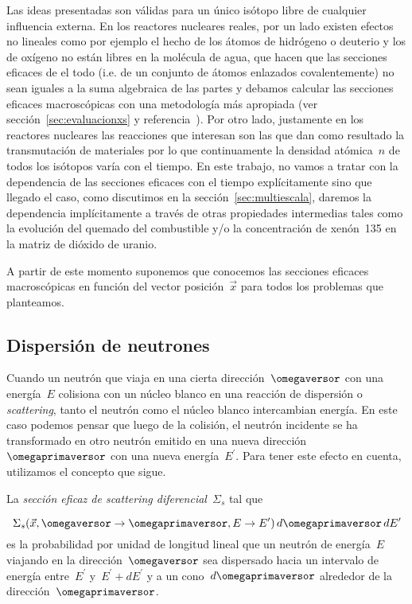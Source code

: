 Las ideas presentadas son válidas para un único isótopo libre de cualquier influencia externa. En los reactores nucleares reales, por un lado existen efectos no lineales como por ejemplo el hecho de los átomos de hidrógeno o deuterio y los de oxígeno no están libres en la molécula de agua, que hacen que las secciones eficaces de el todo (i.e. de un conjunto de átomos enlazados covalentemente) no sean iguales a la suma algebraica de las partes y debamos calcular las secciones eficaces macroscópicas con una metodología más apropiada (ver sección~\ref{sec:evaluacionxs} y referencia~\cite{methods}). Por otro lado, justamente en los reactores nucleares las reacciones que interesan son las que dan como resultado la transmutación de materiales por lo que continuamente la densidad atómica~$n$ de todos los isótopos varía con el tiempo. En este trabajo, no vamos a tratar con la dependencia de las secciones eficaces con el tiempo explícitamente sino que llegado el caso, como discutimos en la sección~\ref{sec:multiescala}, daremos la dependencia implícitamente a través de otras propiedades intermedias tales como la evolución del quemado del combustible y/o la concentración de xenón~135 en la matriz de dióxido de uranio.

\medskip

A partir de este momento suponemos que conocemos las secciones eficaces macroscópicas en función del vector posición~$\vec{x}$ para todos los problemas que planteamos.

\subsection{Dispersión de neutrones} %
\label{sec:scattering}

Cuando un neutrón que viaja en una cierta dirección~$\omegaversor$ con una energía~$E$ colisiona con un núcleo blanco en una reacción de dispersión o \emph{scattering}, tanto el neutrón como el núcleo blanco intercambian energía. En este caso podemos pensar que luego de la colisión, el neutrón incidente se ha transformado en otro neutrón emitido en una nueva dirección~$\omegaprimaversor$ con una nueva energía~$E^\prime$. Para tener este efecto en cuenta, utilizamos el concepto que sigue.

\begin{definicion}
\label{def:sigmasdif}
La \emph{sección eficaz de scattering diferencial}~$\Sigma_s$ tal que

\begin{equation*}
\Sigma_s(\vec{x}, \omegaversor \rightarrow \omegaprimaversor, E \rightarrow E^\prime) \, d\omegaprimaversor \, dE^\prime 
\end{equation*}
%
es la probabilidad por unidad de longitud lineal que un neutrón de energía~$E$ viajando en la dirección~$\omegaversor$ sea dispersado hacia un intervalo de energía entre~$E^\prime$ y~$E^\prime + dE^\prime$ y a un cono~$d\omegaprimaversor$ alrededor de la dirección~$\omegaprimaversor$.
\end{definicion}

